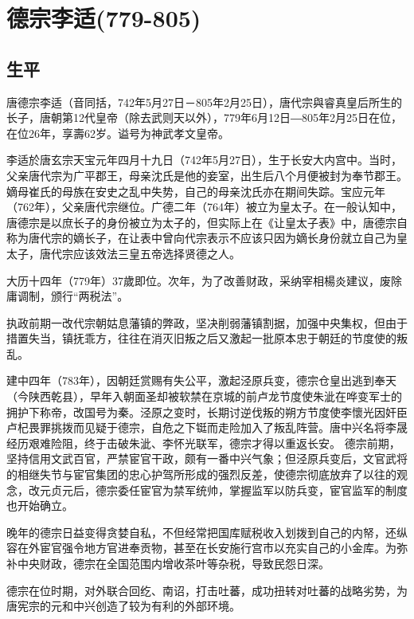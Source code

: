 
\section{德宗李适\tiny(779-805)}

\subsection{生平}

唐德宗李适（音同括，742年5月27日－805年2月25日），唐代宗與睿真皇后所生的长子，唐朝第12代皇帝（除去武则天以外），779年6月12日―805年2月25日在位，在位26年，享壽62岁。谥号为神武孝文皇帝。

李适於唐玄宗天宝元年四月十九日（742年5月27日），生于长安大内宫中。当时，父亲唐代宗为广平郡王，母亲沈氏是他的妾室，出生后八个月便被封为奉节郡王。嫡母崔氏的母族在安史之乱中失势，自己的母亲沈氏亦在期间失踪。宝应元年（762年），父亲唐代宗继位。广德二年（764年）被立为皇太子。在一般认知中，唐德宗是以庶长子的身份被立为太子的，但实际上在《让皇太子表》中，唐德宗自称为唐代宗的嫡长子，在让表中曾向代宗表示不应该只因为嫡长身份就立自己为皇太子，唐代宗应该效法三皇五帝选择贤德之人。

大历十四年（779年）37歲即位。次年，为了改善财政，采纳宰相楊炎建议，废除庸调制，颁行“两税法”。

执政前期一改代宗朝姑息藩镇的弊政，坚决削弱藩镇割据，加强中央集权，但由于措置失当，镇抚乖方，往往在消灭旧叛之后又激起一批原本忠于朝廷的节度使的叛乱。

建中四年（783年），因朝廷赏赐有失公平，激起泾原兵变，德宗仓皇出逃到奉天（今陕西乾县），早年入朝面圣却被软禁在京城的前卢龙节度使朱泚在哗变军士的拥护下称帝，改国号为秦。泾原之变时，长期讨逆伐叛的朔方节度使李懷光因奸臣卢杞畏罪挑拨而见疑于德宗，自危之下铤而走险加入了叛乱阵营。唐中兴名将李晟经历艰难险阻，终于击破朱泚、李怀光联军，德宗才得以重返长安。 德宗前期，坚持信用文武百官，严禁宦官干政，颇有一番中兴气象；但泾原兵变后，文官武将的相继失节与宦官集团的忠心护驾所形成的强烈反差，使德宗彻底放弃了以往的观念，改元贞元后，德宗委任宦官为禁军统帅，掌握监军以防兵变，宦官监军的制度也开始确立。

晚年的德宗日益变得贪婪自私，不但经常把国库赋税收入划拨到自己的内帑，还纵容在外宦官强令地方官进奉贡物，甚至在长安施行宫市以充实自己的小金库。为弥补中央财政，德宗在全国范围内增收茶叶等杂税，导致民怨日深。

德宗在位时期，对外联合回纥、南诏，打击吐蕃，成功扭转对吐蕃的战略劣势，为唐宪宗的元和中兴创造了较为有利的外部环境。

